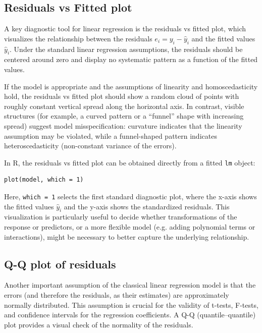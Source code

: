 \subsection{Residuals vs Fitted plot}

A key diagnostic tool for linear regression is the residuals vs fitted plot, which visualizes the relationship between the residuals $e_i = y_i - \hat{y}_i$ and the fitted values $\hat{y}_i$. Under the standard linear regression assumptions, the residuals should be centered around zero and display no systematic pattern as a function of the fitted values.

If the model is appropriate and the assumptions of linearity and homoscedasticity hold, the residuals vs fitted plot should show a random cloud of points with roughly constant vertical spread along the horizontal axis. In contrast, visible structures (for example, a curved pattern or a “funnel” shape with increasing spread) suggest model misspecification: curvature indicates that the linearity assumption may be violated, while a funnel-shaped pattern indicates heteroscedasticity (non-constant variance of the errors).

In R, the residuals vs fitted plot can be obtained directly from a fitted \texttt{lm} object:

\begin{verbatim}
plot(model, which = 1)
\end{verbatim}

Here, \texttt{which = 1} selects the first standard diagnostic plot, where the x-axis shows the fitted values $\hat{y}_i$ and the y-axis shows the standardized residuals. This visualization is particularly useful to decide whether transformations of the response or predictors, or a more flexible model (e.g. adding polynomial terms or interactions), might be necessary to better capture the underlying relationship.


\subsection{Q-Q plot of residuals}

Another important assumption of the classical linear regression model is that the errors (and therefore the residuals, as their estimates) are approximately normally distributed. This assumption is crucial for the validity of t-tests, F-tests, and confidence intervals for the regression coefficients. A Q-Q (quantile–quantile) plot provides a visual check of the normality of the residuals.

